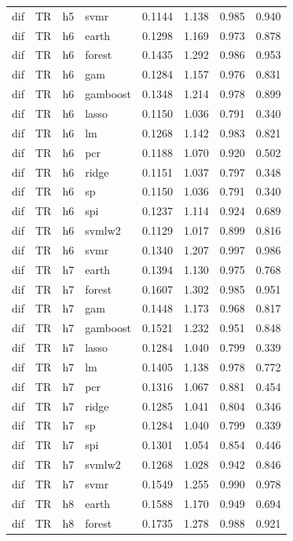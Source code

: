 \begin{ThreePartTable}
\begin{longtable}[t]{llclcccc}
dif & TR & h5 & svmr & 0.1144 & 1.138 & 0.985 & 0.940\\
\addlinespace
dif & TR & h6 & earth & 0.1298 & 1.169 & 0.973 & 0.878\\
dif & TR & h6 & forest & 0.1435 & 1.292 & 0.986 & 0.953\\
dif & TR & h6 & gam & 0.1284 & 1.157 & 0.976 & 0.831\\
dif & TR & h6 & gamboost & 0.1348 & 1.214 & 0.978 & 0.899\\
dif & TR & h6 & lasso & 0.1150 & 1.036 & 0.791 & 0.340\\
dif & TR & h6 & lm & 0.1268 & 1.142 & 0.983 & 0.821\\
dif & TR & h6 & pcr & 0.1188 & 1.070 & 0.920 & 0.502\\
dif & TR & h6 & ridge & 0.1151 & 1.037 & 0.797 & 0.348\\
dif & TR & h6 & sp & 0.1150 & 1.036 & 0.791 & 0.340\\
dif & TR & h6 & spi & 0.1237 & 1.114 & 0.924 & 0.689\\
dif & TR & h6 & svmlw2 & 0.1129 & 1.017 & 0.899 & 0.816\\
dif & TR & h6 & svmr & 0.1340 & 1.207 & 0.997 & 0.986\\
\addlinespace
dif & TR & h7 & earth & 0.1394 & 1.130 & 0.975 & 0.768\\
dif & TR & h7 & forest & 0.1607 & 1.302 & 0.985 & 0.951\\
dif & TR & h7 & gam & 0.1448 & 1.173 & 0.968 & 0.817\\
dif & TR & h7 & gamboost & 0.1521 & 1.232 & 0.951 & 0.848\\
dif & TR & h7 & lasso & 0.1284 & 1.040 & 0.799 & 0.339\\
dif & TR & h7 & lm & 0.1405 & 1.138 & 0.978 & 0.772\\
dif & TR & h7 & pcr & 0.1316 & 1.067 & 0.881 & 0.454\\
dif & TR & h7 & ridge & 0.1285 & 1.041 & 0.804 & 0.346\\
dif & TR & h7 & sp & 0.1284 & 1.040 & 0.799 & 0.339\\
dif & TR & h7 & spi & 0.1301 & 1.054 & 0.854 & 0.446\\
dif & TR & h7 & svmlw2 & 0.1268 & 1.028 & 0.942 & 0.846\\
dif & TR & h7 & svmr & 0.1549 & 1.255 & 0.990 & 0.978\\
\addlinespace
dif & TR & h8 & earth & 0.1588 & 1.170 & 0.949 & 0.694\\
dif & TR & h8 & forest & 0.1735 & 1.278 & 0.988 & 0.921\\

\end{longtable}
\end{ThreePartTable}
